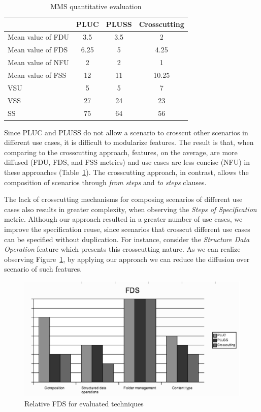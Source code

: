 \documentclass{acm_proc_article-sp}
\begin{document}
\begin{table}[htb]
\centering
\caption{MMS quantitative evaluation}
\label{tab:metrics}
\begin{small}
\begin{tabular}{lccc} \hline
					& PLUC 	& PLUSS 	& Crosscutting	\\ \hline
Mean value of FDU 		& 3.5	& 3.5	& 2		\\
Mean value of FDS 		& 6.25	& 5		& 4.25	\\
Mean value of NFU 		& 2		& 2		& 1		\\
Mean value of FSS 		&12		& 11		& 10.25	\\ 
VSU 					& 5		& 5		& 7		\\
VSS 					& 27		& 24		& 23		\\
SS 					& 75		& 64		& 56		\\	\hline
\end{tabular}
\end{small}
\end{table}

Since PLUC and PLUSS do not allow a
scenario to crosscut other scenarios in different use cases, it
is difficult to modularize features. The
result is that, when comparing to the crosscutting approach,
features, on the average,  are more 
diffused (FDU, FDS, and FSS metrics) and use cases are
less concise (NFU) in these approaches (Table~\ref{tab:metrics}). The crosscutting
approach, in contrast, allows the composition of scenarios
through \emph{from steps} and \emph{to steps} clauses. 

The lack of crosscutting mechanisms for composing scenarios of different use cases also results in greater complexity, when observing the \emph{Steps of Specification} metric. Although our approach resulted in a greater number of use cases, we improve the specification reuse, since scenarios that crosscut different use cases can be specified without duplication. For instance, consider the \emph{Structure Data Operation} feature which presents this crosscutting nature. As we can realize observing Figure~\ref{fig:fds-mms}, by applying our approach we can reduce the diffusion over scenario of such features.

 \begin{figure}[htb]
 \begin{center}
  \includegraphics[scale=0.42]{img/fds-mms.eps}
  \caption{Relative FDS for evaluated techniques}
  \label{fig:fds-mms}
  \end{center}
\end{figure}
\end{document}
